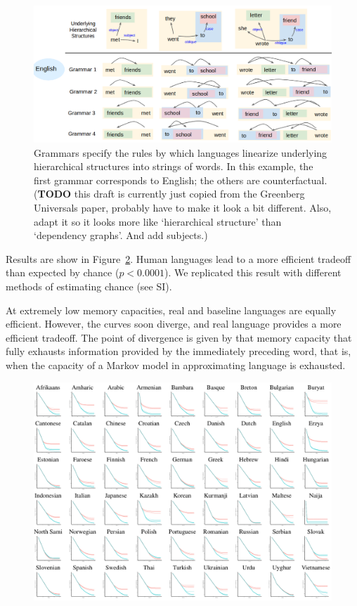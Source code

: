 \documentclass[11pt,letterpaper]{article}
\begin{document}
\begin{figure}
\includegraphics[width=\textwidth]{figures/grammars.png}
	\caption{Grammars specify the rules by which languages linearize underlying hierarchical structures into strings of words. In this example, the first grammar corresponds to English; the others are counterfactual. (\textbf{TODO} this draft is currently just copied from the Greenberg Universals paper, probably have to make it look a bit different. Also, adapt it so it looks more like `hierarchical structure' than `dependency graphs'. And add subjects.) }\label{fig:grammars}
\end{figure}



Results are show in Figure~\ref{fig:results}.
Human languages lead to a more efficient tradeoff than expected by chance ($p < 0.0001$).
We replicated this result with different methods of estimating chance (see SI).

At extremely low memory capacities, real and baseline languages are equally efficient.
However, the curves soon diverge, and real language provides a more efficient tradeoff.
The point of divergence is given by that memory capacity that fully exhausts information provided by the immediately preceding word, that is, when the capacity of a Markov model in approximating language is exhausted.


\begin{figure}
\includegraphics[width=\textwidth]{figures/full-results.png}
	\caption{}\label{fig:results}
\end{figure}
\end{document}
